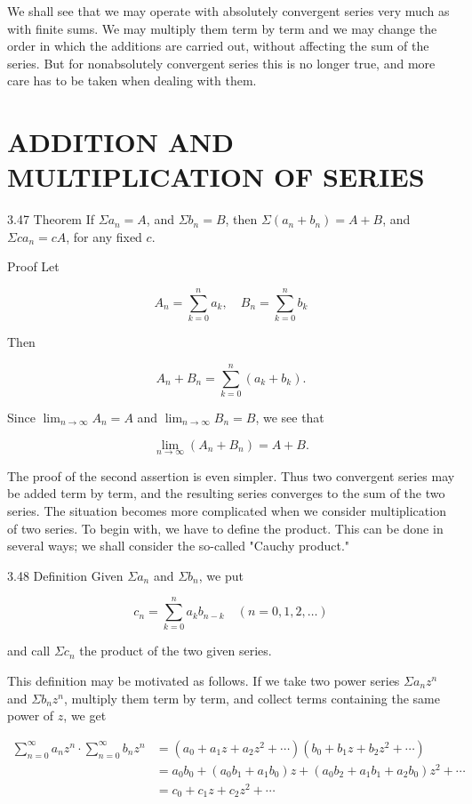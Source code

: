 \documentclass[10pt]{article}
\begin{document}
We shall see that we may operate with absolutely convergent series very much as with finite sums. We may multiply them term by term and we may change the order in which the additions are carried out, without affecting the sum of the series. But for nonabsolutely convergent series this is no longer true, and more care has to be taken when dealing with them.

\section{ADDITION AND MULTIPLICATION OF SERIES}
3.47 Theorem If $\Sigma a_{n}=A$, and $\Sigma b_{n}=B$, then $\Sigma\left(a_{n}+b_{n}\right)=A+B$, and $\Sigma c a_{n}=c A$, for any fixed $c$.

Proof Let

$$
A_{n}=\sum_{k=0}^{n} a_{k}, \quad B_{n}=\sum_{k=0}^{n} b_{k}
$$

Then

$$
A_{n}+B_{n}=\sum_{k=0}^{n}\left(a_{k}+b_{k}\right) .
$$

Since $\lim _{n \rightarrow \infty} A_{n}=A$ and $\lim _{n \rightarrow \infty} B_{n}=B$, we see that

$$
\lim _{n \rightarrow \infty}\left(A_{n}+B_{n}\right)=A+B .
$$

The proof of the second assertion is even simpler. Thus two convergent series may be added term by term, and the resulting series converges to the sum of the two series. The situation becomes more complicated when we consider multiplication of two series. To begin with, we have to define the product. This can be done in several ways; we shall consider the so-called "Cauchy product."

3.48 Definition Given $\Sigma a_{n}$ and $\Sigma b_{n}$, we put

$$
c_{n}=\sum_{k=0}^{n} a_{k} b_{n-k} \quad(n=0,1,2, \ldots)
$$

and call $\Sigma c_{n}$ the product of the two given series.

This definition may be motivated as follows. If we take two power series $\Sigma a_{n} z^{n}$ and $\Sigma b_{n} z^{n}$, multiply them term by term, and collect terms containing the same power of $z$, we get

$$
\begin{aligned}
\sum_{n=0}^{\infty} a_{n} z^{n} \cdot \sum_{n=0}^{\infty} b_{n} z^{n} & =\left(a_{0}+a_{1} z+a_{2} z^{2}+\cdots\right)\left(b_{0}+b_{1} z+b_{2} z^{2}+\cdots\right) \\
& =a_{0} b_{0}+\left(a_{0} b_{1}+a_{1} b_{0}\right) z+\left(a_{0} b_{2}+a_{1} b_{1}+a_{2} b_{0}\right) z^{2}+\cdots \\
& =c_{0}+c_{1} z+c_{2} z^{2}+\cdots
\end{aligned}
$$
\end{document}
